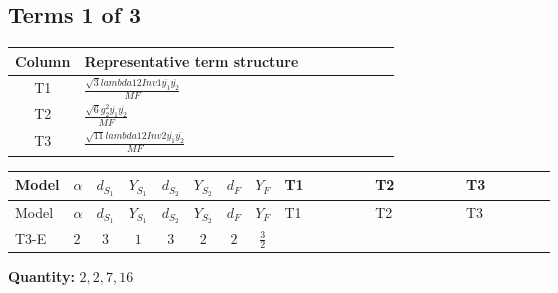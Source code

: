 \documentclass[8pt]{article}
\begin{document}
\begin{landscape}
\subsection*{Terms 1 of 3}
\begin{center}
\begin{tabular}{@{}c >{\raggedright\arraybackslash}p{0.82\linewidth}@{}}
\toprule
Column & Representative term structure \\
\midrule
T1 & \(\displaystyle \frac{\sqrt{3} lambda12Inv1 \overline{y_{1}} \overline{y_{2}}}{MF}\) \\
\midrule
T2 & \(\displaystyle \frac{\sqrt{6} g_{2}^{2} \overline{y_{1}} \overline{y_{2}}}{MF}\) \\
\midrule
T3 & \(\displaystyle \frac{\sqrt{11} lambda12Inv2 \overline{y_{1}} \overline{y_{2}}}{MF}\) \\
\midrule
\bottomrule
\end{tabular}
\end{center}
\smallskip
\tiny
\begin{longtable}{@{}llcccccc >{\raggedright\arraybackslash}p{0.21\linewidth} >{\raggedright\arraybackslash}p{0.21\linewidth} >{\raggedright\arraybackslash}p{0.21\linewidth}@{}}
\toprule
Model & $\alpha$ & $d_{S_1}$ & $Y_{S_1}$ & $d_{S_2}$ & $Y_{S_2}$ & $d_F$ & $Y_F$ & T1 & T2 & T3 \\
\midrule
\endfirsthead
\toprule
Model & $\alpha$ & $d_{S_1}$ & $Y_{S_1}$ & $d_{S_2}$ & $Y_{S_2}$ & $d_F$ & $Y_F$ & T1 & T2 & T3 \\
\midrule
\endhead
T3-E & $2$ & $3$ & $1$ & $3$ & $2$ & $2$ & $\frac{3}{2}$ & \scriptsize\adjustbox{max width=\linewidth}{$\begin{gathered} - \frac{\sqrt{3} lambda12Inv1 \overline{y_{1}} \overline{y_{2}}}{6 MF}\end{gathered}$} & \scriptsize\adjustbox{max width=\linewidth}{$\begin{gathered} \frac{\sqrt{6} g_{2}^{2} \overline{y_{1}} \overline{y_{2}}}{3 MF}\end{gathered}$} & \scriptsize\adjustbox{max width=\linewidth}{$\begin{gathered} \frac{3 \sqrt{11} lambda12Inv2 \overline{y_{1}} \overline{y_{2}}}{22 MF}\end{gathered}$} \\
\midrule
\bottomrule
\end{longtable}
\clearpage
\noindent\textbf{Quantity: }$\mathrm{2,2,7,16}$\par\smallskip

\end{landscape}
\end{document}
